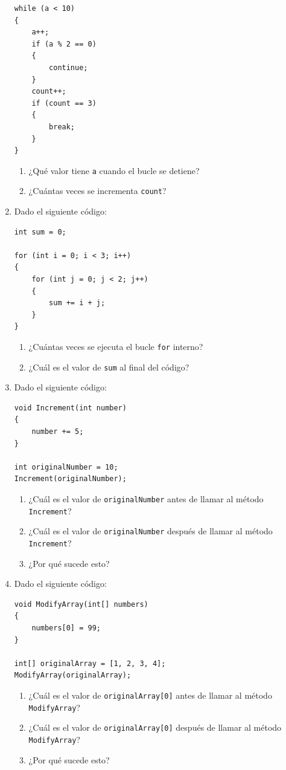 \begin{enumerate}
\begin{lstlisting}
while (a < 10)
{
    a++;
    if (a % 2 == 0)
    {
        continue;
    }
    count++;
    if (count == 3)
    {
        break;
    }
}
\end{lstlisting}
\begin{enumerate}
    \item ¿Qué valor tiene \texttt{a} cuando el bucle se detiene?
    \item ¿Cuántas veces se incrementa \texttt{count}?
\end{enumerate}

\item Dado el siguiente código:
\begin{lstlisting}
int sum = 0;

for (int i = 0; i < 3; i++)
{
    for (int j = 0; j < 2; j++)
    {
        sum += i + j;
    }
}
\end{lstlisting}
\begin{enumerate}
    \item ¿Cuántas veces se ejecuta el bucle \texttt{for} interno?
    \item ¿Cuál es el valor de \texttt{sum} al final del código?
\end{enumerate}

\item Dado el siguiente código:
\begin{lstlisting}
void Increment(int number)
{
    number += 5;
}

int originalNumber = 10;
Increment(originalNumber);
\end{lstlisting}
\begin{enumerate}
    \item ¿Cuál es el valor de \texttt{originalNumber} antes de llamar al método \texttt{Increment}?
    \item ¿Cuál es el valor de \texttt{originalNumber} después de llamar al método \texttt{Increment}?
    \item ¿Por qué sucede esto?
\end{enumerate}

\item Dado el siguiente código:
\begin{lstlisting}
void ModifyArray(int[] numbers)
{
    numbers[0] = 99;
}

int[] originalArray = [1, 2, 3, 4];
ModifyArray(originalArray);
\end{lstlisting}
\begin{enumerate}
    \item ¿Cuál es el valor de \texttt{originalArray[0]} antes de llamar al método \texttt{ModifyArray}?
    \item ¿Cuál es el valor de \texttt{originalArray[0]} después de llamar al método \texttt{ModifyArray}?
    \item ¿Por qué sucede esto?
\end{enumerate}


\end{enumerate}
